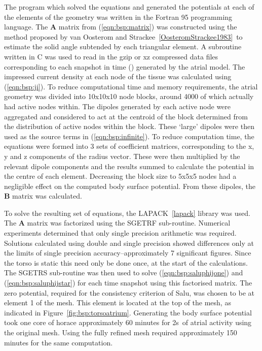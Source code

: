 The program which solved the equations and generated the potentials at each of
the elements of the geometry was written in the Fortran 95 programming language.
The $\mathbf{A}$ matrix from (\ref{eqn:bsp:matrix}) was constructed using the
method proposed by van Oosterom and Strackee~\ref{OosteromStrackee1983}\ to
estimate the solid angle subtended by each triangular element.
A subroutine written in C was used to read in the gzip or xz compressed
data files corresponding to each snapshot in time () generated by the
atrial model.
The impressed current density at each node of the tissue was calculated using
(\ref{eqn:bsp:ji}).
To reduce computational time and memory requirements, the atrial geometry was
divided into 10x10x10 node blocks, around 4000 of which actually had active
nodes within.
The dipoles generated by each active node were aggregated and considered to act
at the centroid of the block determined from the distribution of active nodes
within the block.
These `large' dipoles were then used as the source terms in
(\ref{eqn:bsp:infinite}).
To reduce computation time, the equations were formed into 3 sets of coefficient
matrices, corresponding to the x, y and z components of the radius vector.
These were then multiplied by the relevant dipole components and the results
summed to calculate the potential in the centre of each element.
Decreasing the block size to 5x5x5 nodes had a negligible effect on the computed
body surface potential.
From these dipoles, the $\mathbf{B}$ matrix was calculated.

To solve the resulting set of equations, the LAPACK~\ref{lapack} library was
used.
The $\mathbf{A}$ matrix was factorized using the SGETRF sub-routine.
Numerical experiments determined that only single precision arithmetic was
required.
Solutions calculated using double and single precision showed differences only at
the limits of single precision accuracy--approximately 7 significant figures.
Since the torso is static this need only be done once, at the start of the
calculations.
The SGETRS sub-routine was then used to solve (\ref{eqn:bsp:saluphijone}) and
(\ref{eqn:bsp:saluphijstar}) for each time snapshot using this factorised
matrix.
The zero potential, required for the consistency criterion of Salu, was chosen
to be at element 1 of the mesh.
This element is located at the top of the mesh, as indicated in
Figure~\ref{fig:bsp:torsoatrium}.
Generating the body surface potential took one core of horace approximately 60
minutes for \unit{2}{s}\ of atrial activity using the original mesh.
Using the fully refined mesh required approximately 150 minutes for the same
computation.


